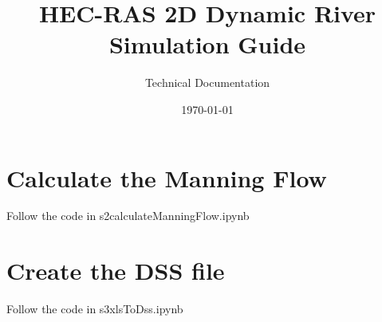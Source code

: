 \documentclass[11pt, a4paper]{article}
\title{\textbf{HEC-RAS 2D Dynamic River Simulation Guide}}
\author{Technical Documentation}
\date{\today}
\begin{document}
\maketitle

\section{Calculate the Manning Flow}

Follow the code in s2calculateManningFlow.ipynb

\section{Create the DSS file}

Follow the code in s3xlsToDss.ipynb
\end{document}
